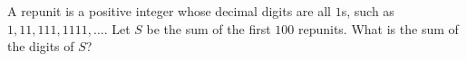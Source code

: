 A repunit is a positive integer whose decimal digits are all $1$s, such as $1,11,111,1111,\dots$. Let $S$ be the sum of the first $100$ repunits. What is the sum of the digits of $S$?
